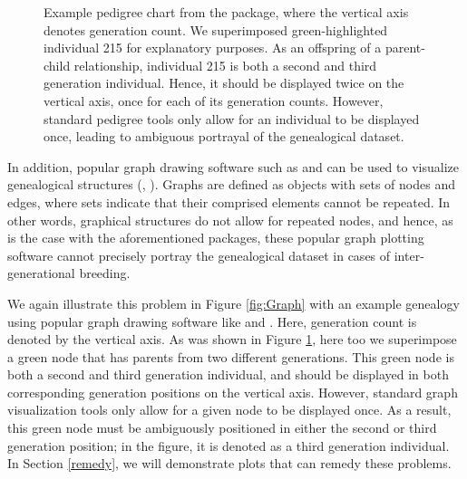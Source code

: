 \documentclass[article,shortnames]{jss}
\begin{document}
\begin{figure}[H]
    \centering
    \caption{Example pedigree chart from the  package, where the vertical axis denotes generation count. We superimposed green-highlighted individual 215 for explanatory purposes. As an offspring of a parent-child relationship, individual 215 is both a second and third generation individual. Hence, it should be displayed twice on the vertical axis, once for each of its generation counts. However, standard pedigree tools only allow for an individual to be displayed once, leading to ambiguous portrayal of the genealogical dataset.}
    \label{fig:kinshipFig}
\end{figure}

In addition, popular graph drawing software such as  and  can be used to visualize genealogical structures (\citealt{graphvizCit}, \citealt{cytoscapeCit}). Graphs are defined as objects with sets of nodes and edges, where sets indicate that their comprised elements cannot be repeated. In other words, graphical structures do not allow for repeated nodes, and hence, as is the case with the aforementioned  packages, these popular graph plotting software cannot precisely portray the genealogical dataset in cases of inter-generational breeding.

We again illustrate this problem in Figure \ref{fig:Graph} with an example genealogy using popular graph drawing software like  and . Here, generation count is denoted by the vertical axis. As was shown in Figure \ref{fig:kinshipFig}, here too we superimpose a green node that has parents from two different generations. This green node is both a second and third generation individual, and should be displayed in both corresponding generation positions on the vertical axis. However, standard graph visualization tools only allow for a given node to be displayed once. As a result, this green node must be ambiguously positioned in either the second or third generation position; in the figure, it is denoted as a third generation individual. In Section \ref{remedy}, we will demonstrate  plots that can remedy these problems.
\end{document}
